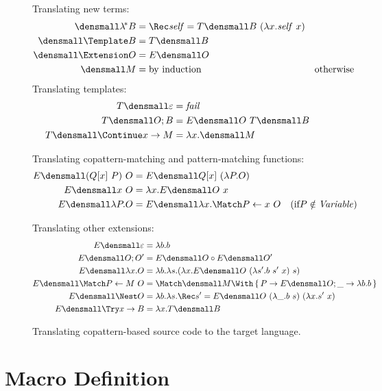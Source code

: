 \documentclass[runningheads]{llncs}
\begin{document}
\begin{figure}
\centering
Translating new terms:  
\begin{align*}
  \den{\lamstar B}
  &=
  \Rec \mathit{self} = T\den{B} ~ (\lambda x. \mathit{self} ~ x)
  \\
  \den{\Template B}
  &=
  T\den{B}
  \\
  \den{\Extension O}
  &=
  E\den{O}
  \\
  \den{M}
  &=
  \text{by induction}
  &\text{otherwise}
\end{align*}
Translating templates:
\begin{align*}
  T\den{\varepsilon}
  &=
  \mathit{fail}
  \\
  T\den{O; B}
  &=
  E\den{O} ~ T\den{B}
  \\
  T\den{\Continue x \to M}
  &=
  \lambda x. \den{M}
\end{align*}

Translating copattern-matching and pattern-matching functions:
\begin{align*}
  E\den{(Q[x] ~ P) ~ O}
  &=
  E\den{Q[x] ~ (\lambda P. O)}
  \\
  E\den{x ~ O}
  &=
  \lambda x. E\den{O} ~ x
  \\
  E\den{\lambda P. O}
  &=
  E\den{\lambda x. \Match P \gets x ~ O}
  &(\text{if} P \notin \mathit{Variable})
\end{align*}

Translating other extensions:
\begin{align*}
  E\den{\varepsilon}
  &=
  \lambda b. b
  \\
  E\den{O; O'}
  &=
  E\den{O} \comp E\den{O'}
  \\
  E\den{\lambda x. O}
  &=
  \lambda b. \lambda s. (\lambda x. E\den{O} ~ (\lambda s'. b ~ s' ~ x) ~ s)
  \\
  E\den{\Match P \gets M ~ O}
  &=
  \Match \den{M} \With \set{P \to E\den{O}; \_ \to \lambda b. b}
  \\
  E\den{\Nest O}
  &=
  \lambda b. \lambda s. \Rec s' = E\den{O} ~ (\lambda \_. b ~ s) ~ (\lambda x. s' ~ x)
  \\
  E\den{\Try x \to B}
  &=
  \lambda x. T\den{B}
\end{align*}
\caption{Translating copattern-based source code to the target language.}
\label{fig:translation}
\end{figure}


\section{Macro Definition}
\end{document}
